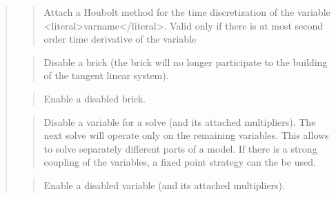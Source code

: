 \documentclass[a4paper,11pt,english]{sphinxmanual}
\begin{document}
\begin{quote}
\sphinxAtStartPar
{}
\begin{quote}

\sphinxAtStartPar
Attach a Houbolt method for the time discretization of the variable
\textless{}literal\textgreater{}varname\textless{}/literal\textgreater{}. Valid only if there is at most second order time derivative
of the variable
\end{quote}

\sphinxAtStartPar
{}
\begin{quote}

\sphinxAtStartPar
Disable a brick (the brick will no longer participate to the
building of the tangent linear system).
\end{quote}

\sphinxAtStartPar
{}
\begin{quote}

\sphinxAtStartPar
Enable a disabled brick.
\end{quote}

\sphinxAtStartPar
{}
\begin{quote}

\sphinxAtStartPar
Disable a variable for a solve (and its attached multipliers).
The next solve will operate only on
the remaining variables. This allows to solve separately different
parts of a model. If there is a strong coupling of the variables,
a fixed point strategy can the be used.
\end{quote}

\sphinxAtStartPar
{}
\begin{quote}

\sphinxAtStartPar
Enable a disabled variable (and its attached multipliers).
\end{quote}

\sphinxAtStartPar
{}
\begin{quote}


\end{quote}
\end{quote}
\end{document}
